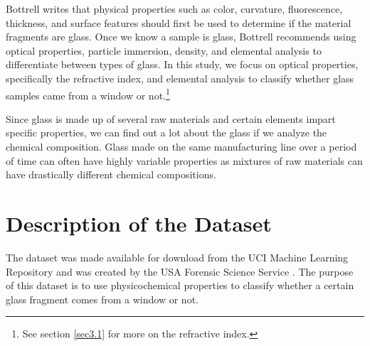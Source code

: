 \documentclass[12pt,halfline,a4paper]{ouparticle}
\begin{document}
Bottrell writes that physical properties such as color, curvature, fluorescence, thickness, and surface features should first be used to determine if the material fragments are glass. Once we know a sample is glass, Bottrell recommends using optical properties, particle immersion, density, and elemental analysis to differentiate between types of glass. In this study, we focus on optical properties, specifically the refractive index, and elemental analysis to classify whether glass samples came from a window or not.\footnote{See section \ref{sec3.1} for more on the refractive index.}

Since glass is made up of several raw materials and certain elements impart specific properties, we can find out a lot about the glass if we analyze the chemical composition. Glass made on the same manufacturing line over a period of time can often have highly variable properties as mixtures of raw materials can have drastically different chemical compositions. 

\section{Description of the Dataset}
\label{sec3}
The dataset was made available for download from the UCI Machine Learning Repository and was created by the USA Forensic Science Service \cite{murphy1994}. The purpose of this dataset is to use physicochemical properties to classify whether a certain glass fragment comes from a window or not. 
\end{document}
